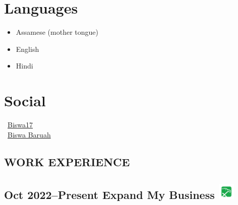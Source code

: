 \documentclass[10pt,a4paper]{article}
\begin{document}
\begin{paracol}{2}
\begin{leftcolumn}
\section*{Languages}
\textcolor{textgrey}{
\begin{itemize}
    \item Assamese (mother tongue)
    \item English
    \item Hindi
\end{itemize}
}

\section*{Social}
\textcolor{textgrey}{
\faGithub\ \href{https://github.com/Biswa17}{Biswa17} \\
\faLinkedin\ \href{https://linkedin.com/in/biswa-baruah}{Biswa Baruah}
}

\end{leftcolumn}

\begin{rightcolumn}

\section*{WORK EXPERIENCE}
\subsection*{Oct 2022–Present Expand My Business \hfill \includegraphics[width=0.06\textwidth,height=0.06\textwidth,keepaspectratio]{exmyb.png}}

\end{rightcolumn}
\end{paracol}
\end{document}
